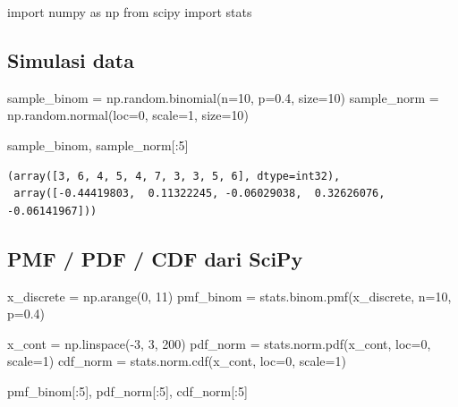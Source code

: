 \documentclass[
  letterpaper,
  DIV=11,
  numbers=noendperiod]{scrreprt}
\newenvironment{Shaded}{\begin{snugshade}}{\end{snugshade}}
\newcommand{\DecValTok}[1]{\textcolor[rgb]{0.68,0.00,0.00}{#1}}
\newcommand{\FloatTok}[1]{\textcolor[rgb]{0.68,0.00,0.00}{#1}}
\newcommand{\ImportTok}[1]{\textcolor[rgb]{0.00,0.46,0.62}{#1}}
\newcommand{\NormalTok}[1]{\textcolor[rgb]{0.00,0.23,0.31}{#1}}
\newcommand{\OperatorTok}[1]{\textcolor[rgb]{0.37,0.37,0.37}{#1}}
\begin{document}
\begin{Shaded}
\begin{Highlighting}[]
\ImportTok{import}\NormalTok{ numpy }\ImportTok{as}\NormalTok{ np}
\ImportTok{from}\NormalTok{ scipy }\ImportTok{import}\NormalTok{ stats}
\end{Highlighting}
\end{Shaded}

\subsection{Simulasi data}\label{simulasi-data}

\begin{Shaded}
\begin{Highlighting}[]
\NormalTok{sample\_binom }\OperatorTok{=}\NormalTok{ np.random.binomial(n}\OperatorTok{=}\DecValTok{10}\NormalTok{, p}\OperatorTok{=}\FloatTok{0.4}\NormalTok{, size}\OperatorTok{=}\DecValTok{10}\NormalTok{)}
\NormalTok{sample\_norm }\OperatorTok{=}\NormalTok{ np.random.normal(loc}\OperatorTok{=}\DecValTok{0}\NormalTok{, scale}\OperatorTok{=}\DecValTok{1}\NormalTok{, size}\OperatorTok{=}\DecValTok{10}\NormalTok{)}

\NormalTok{sample\_binom, sample\_norm[:}\DecValTok{5}\NormalTok{]}
\end{Highlighting}
\end{Shaded}

\begin{verbatim}
(array([3, 6, 4, 5, 4, 7, 3, 3, 5, 6], dtype=int32),
 array([-0.44419803,  0.11322245, -0.06029038,  0.32626076, -0.06141967]))
\end{verbatim}

\subsection{PMF / PDF / CDF dari SciPy}\label{pmf-pdf-cdf-dari-scipy}

\begin{Shaded}
\begin{Highlighting}[]
\NormalTok{x\_discrete }\OperatorTok{=}\NormalTok{ np.arange(}\DecValTok{0}\NormalTok{, }\DecValTok{11}\NormalTok{)}
\NormalTok{pmf\_binom }\OperatorTok{=}\NormalTok{ stats.binom.pmf(x\_discrete, n}\OperatorTok{=}\DecValTok{10}\NormalTok{, p}\OperatorTok{=}\FloatTok{0.4}\NormalTok{)}

\NormalTok{x\_cont }\OperatorTok{=}\NormalTok{ np.linspace(}\OperatorTok{{-}}\DecValTok{3}\NormalTok{, }\DecValTok{3}\NormalTok{, }\DecValTok{200}\NormalTok{)}
\NormalTok{pdf\_norm }\OperatorTok{=}\NormalTok{ stats.norm.pdf(x\_cont, loc}\OperatorTok{=}\DecValTok{0}\NormalTok{, scale}\OperatorTok{=}\DecValTok{1}\NormalTok{)}
\NormalTok{cdf\_norm }\OperatorTok{=}\NormalTok{ stats.norm.cdf(x\_cont, loc}\OperatorTok{=}\DecValTok{0}\NormalTok{, scale}\OperatorTok{=}\DecValTok{1}\NormalTok{)}

\NormalTok{pmf\_binom[:}\DecValTok{5}\NormalTok{], pdf\_norm[:}\DecValTok{5}\NormalTok{], cdf\_norm[:}\DecValTok{5}\NormalTok{]}
\end{Highlighting}
\end{Shaded}
\end{document}

